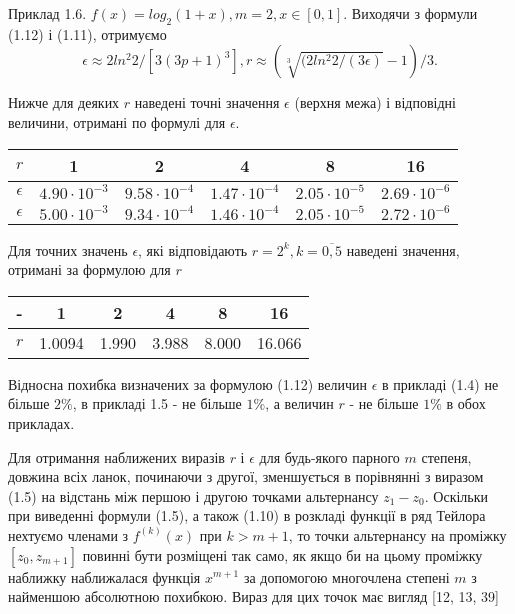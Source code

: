 \documentclass[ukrainian,14pt]{extarticle}
\begin{document}
Приклад 1.6. $f(x) = log_2 (1+x), m = 2, x \in [0, 1].$ Виходячи з формули (1.12) і (1.11), отримуємо
    $$\epsilon \approx 2 ln^2 2/[3(3p + 1)^3], r \approx (\sqrt[3]{(2 ln^2 2/ (3\epsilon)} - 1) /3.$$
    
    Нижче для деяких $r$ наведені точні значення $\epsilon$ (верхня межа) і відповідні величини, отримані по формулі для $\epsilon$.
    
\bgroup
\def\arraystretch{1.5}
\begin{center}
\begin{tabular}{ c | c |
c | c | c | c}
 $r$ & 1 & 2 & 4 & 8 & 16 \\
 \hline
 $\epsilon$ & $4.90 \cdot 10^{-3}$ & $9.58 \cdot 10^{-4}$ & $1.47 \cdot 10^{-4}$ & $2.05 \cdot 10^{-5}$ & $2.69 \cdot 10^{-6}$ \\  
 \hline
 $\epsilon$ & $5.00 \cdot 10^{-3}$ & $9.34 \cdot 10^{-4}$ & $1.46 \cdot 10^{-4}$ & $2.05 \cdot 10^{-5}$ & $2.72 \cdot 10^{-6}$ \\  

\end{tabular}
\end{center}
\egroup

Для точних значень $\epsilon$, які відповідають $r = 2^k, k = \overline{0, 5}$ наведені значення, отримані за формулою для $r$

\bgroup
\def\arraystretch{1.5}
\begin{center}
\begin{tabular}{ c | c |
c | c | c | c}
 - & 1 & 2 & 4 & 8 & 16 \\
 \hline
 $r$ & 1.0094 & 1.990 & 3.988 & 8.000 & 16.066 \\  

\end{tabular}
\end{center}
\egroup

Відносна похибка визначених за формулою (1.12) величин $\epsilon$ в прикладі (1.4) не більше $2\%$, в прикладі 1.5 - не більше $1\%$, а величин $r$ - не більше $1\%$ в обох прикладах.

Для отримання наближених виразів $r$ і $\epsilon$ для будь-якого парного $m$ степеня, довжина всіх ланок, починаючи з другої, зменшується в порівнянні з виразом (1.5) на відстань між першою і другою точками альтернансу $z_1 - z_0$. Оскільки при виведенні формули (1.5), а також (1.10) в розкладі функції в ряд Тейлора нехтуємо членами з $f^{(k)}(x)$ при $k > m + 1$, то точки альтернансу на проміжку $[z_0, z_{m+1}]$ повинні бути розміщені так само, як якщо би на цьому проміжку наближку наближалася функція $x^{m+1}$ за допомогою многочлена степені $m$ з найменшою абсолютною похибкою. Вираз для цих точок має вигляд [12, 13, 39]
\end{document}
